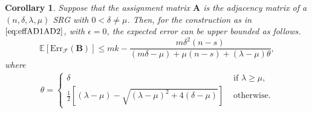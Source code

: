 \documentclass[journal,draftcls,onecolumn]{IEEEtran}
\theoremstyle{mystyle}
\newtheorem{defn}{Definition}
\newtheorem{cor}{Corollary}
\newcommand{\aditya}[1]{\marginpar{+}{\bf Aditya's remark}: {\em #1}}
\newcommand{\sifat}[1]{\marginpar{+}{\bf Sifat's remark}: {\em #1}}
\begin{document}


\begin{cor}
\label{cor:SRG}
Suppose that the assignment matrix $\mathbf{A}$ is the adjacency matrix of a $(n, \delta, \lambda, \mu)$ SRG with $0 <\delta \ne \mu$. 
Then, for the construction as in $\eqref{eq:effAD1AD2}$, with $\epsilon  = 0$, the expected error can be upper bounded as follows.
\begin{equation}
\mathbb{E}[\text{Err}_{\mathcal{F}}(\mathbf{B})] \le mk -   \frac{m\delta^2(n-s)} {(m\delta - \mu)+ \mu(n-s) + (\lambda - \mu)\theta},
\end{equation}
where
\begin{align*}
    \theta = \begin{cases}
        \delta & \text{~if~} \lambda \geq \mu,\\
        \frac{1}{2} \left[ (\lambda - \mu) - \sqrt{(\lambda - \mu)^2 + 4 (\delta - \mu)} \right] & \text{~otherwise.}
    \end{cases}
\end{align*}

\end{cor}
\end{document}
